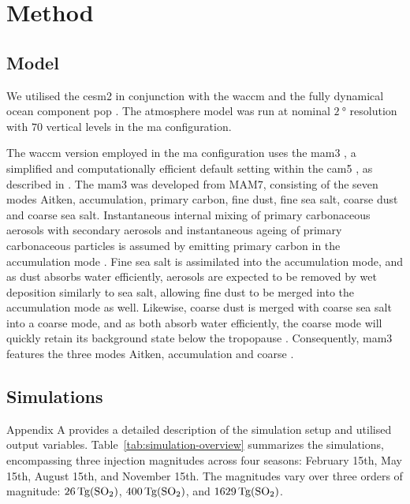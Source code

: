 \documentclass{ametsocV6.1}
\begin{document}
\section{Method}\label{sec:method}

\subsection{Model}

We utilised the \gls{cesm2} \citep{danabasoglu2020} in conjunction with the \gls{waccm}
\citep{gettleman2019} and the fully dynamical ocean component \gls{pop}
\citep{smith2010, danabasoglu2020}. The atmosphere model was run at nominal
\(\SI{2}{\degree}\) resolution with \(70\) vertical levels in the \gls{ma}
configuration.

The \gls{waccm} version employed in the \gls{ma} configuration uses the \gls{mam3}
\citep{gettleman2019}, a simplified and computationally efficient default setting within
the \gls{cam5} \citep{liu2016}, as described in \citet{liu2012}. The \gls{mam3} was
developed from MAM7, consisting of the seven modes Aitken, accumulation, primary carbon,
fine dust, fine sea salt, coarse dust and coarse sea salt. Instantaneous internal mixing
of primary carbonaceous aerosols with secondary aerosols and instantaneous ageing of
primary carbonaceous particles is assumed by emitting primary carbon in the accumulation
mode \citep{liu2016}. Fine sea salt is assimilated into the accumulation mode, and as
dust absorbs water efficiently, aerosols are expected to be removed by wet deposition
similarly to sea salt, allowing fine dust to be merged into the accumulation mode as
well. Likewise, coarse dust is merged with coarse sea salt into a coarse mode, and as
both absorb water efficiently, the coarse mode will quickly retain its background state
below the tropopause \citep{liu2012}. Consequently, \gls{mam3} features the three modes
Aitken, accumulation and coarse \citep{liu2016}.

\subsection{Simulations}

Appendix A provides a detailed description of the simulation setup and utilised output
variables. Table~\ref{tab:simulation-overview} summarizes the simulations, encompassing
three  injection magnitudes across four seasons: February 15th, May 15th, August
15th, and November 15th. The magnitudes vary over three orders of magnitude:
\(\SI{26}{\tera\gram(\ce{SO2})}\), \(\SI{400}{\tera\gram(\ce{SO2})}\), and
\(\SI{1629}{\tera\gram(\ce{SO2})}\).
\end{document}
